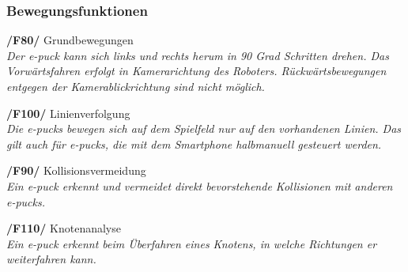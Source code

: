 \documentclass[10pt,a4paper]{article}
\begin{document}
			\subsubsection{Bewegungsfunktionen}
				\begin{list}{}{\leftmargin=1cm}
					\item[\textbf{/F80/}] Grundbewegungen
						\\ \textsl{Der e-puck kann sich links und rechts herum in 90 Grad Schritten drehen. Das Vorwärtsfahren erfolgt
							in Kamerarichtung des Roboters. Rückwärtsbewegungen entgegen der Kamerablickrichtung sind nicht möglich.}
					\item[\textbf{/F100/}] Linienverfolgung
						\\ \textsl{Die e-pucks bewegen sich auf dem Spielfeld nur auf den vorhandenen Linien. Das gilt auch für e-pucks,
						die mit dem Smartphone halbmanuell gesteuert werden.}
					\item[\textbf{/F90/}] Kollisionsvermeidung
						\\ \textsl{Ein e-puck erkennt und vermeidet direkt bevorstehende Kollisionen mit anderen e-pucks.}
					\item[\textbf{/F110/}] Knotenanalyse
						\\ \textsl{Ein e-puck erkennt beim Überfahren eines Knotens, in welche Richtungen er weiterfahren kann.}
				\end{list}
\end{document}
